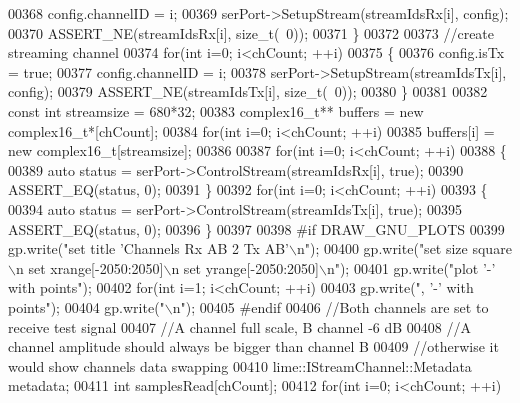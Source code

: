 \begin{DoxyCode}
{{{00368         config.channelID = i;
00369         serPort->SetupStream(streamIdsRx[i], config);
00370         ASSERT\_NE(streamIdsRx[i], \textcolor{keywordtype}{size\_t}(~0));
00371     \}
00372 
00373     \textcolor{comment}{//create streaming channel}
00374     \textcolor{keywordflow}{for}(\textcolor{keywordtype}{int} i=0; i<chCount; ++i)
00375     \{
00376         config.isTx = \textcolor{keyword}{true};
00377         config.channelID = i;
00378         serPort->SetupStream(streamIdsTx[i], config);
00379         ASSERT\_NE(streamIdsTx[i], \textcolor{keywordtype}{size\_t}(~0));
00380     \}
00381 
00382     \textcolor{keyword}{const} \textcolor{keywordtype}{int} streamsize = 680*32;
00383     complex16_t** buffers = \textcolor{keyword}{new} complex16_t*[chCount];
00384     \textcolor{keywordflow}{for}(\textcolor{keywordtype}{int} i=0; i<chCount; ++i)
00385         buffers[i] = \textcolor{keyword}{new} complex16_t[streamsize];
00386 
00387     \textcolor{keywordflow}{for}(\textcolor{keywordtype}{int} i=0; i<chCount; ++i)
00388     \{
00389         \textcolor{keyword}{auto} status = serPort->ControlStream(streamIdsRx[i], \textcolor{keyword}{true});
00390         ASSERT\_EQ(status, 0);
00391     \}
00392     \textcolor{keywordflow}{for}(\textcolor{keywordtype}{int} i=0; i<chCount; ++i)
00393     \{
00394         \textcolor{keyword}{auto} status = serPort->ControlStream(streamIdsTx[i], \textcolor{keyword}{true});
00395         ASSERT\_EQ(status, 0);
00396     \}
00397 
00398 \textcolor{preprocessor}{#if DRAW\_GNU\_PLOTS}
00399     gp.write(\textcolor{stringliteral}{"set title 'Channels Rx AB 2 Tx AB'\(\backslash\)n"});
00400     gp.write(\textcolor{stringliteral}{"set size square\(\backslash\)n set xrange[-2050:2050]\(\backslash\)n set yrange[-2050:2050]\(\backslash\)n"});
00401     gp.write(\textcolor{stringliteral}{"plot '-' with points"});
00402     \textcolor{keywordflow}{for}(\textcolor{keywordtype}{int} i=1; i<chCount; ++i)
00403         gp.write(\textcolor{stringliteral}{", '-' with points"});
00404     gp.write(\textcolor{stringliteral}{"\(\backslash\)n"});
00405 \textcolor{preprocessor}{#endif}
00406     \textcolor{comment}{//Both channels are set to receive test signal}
00407     \textcolor{comment}{//A channel full scale, B channel -6 dB}
00408     \textcolor{comment}{//A channel amplitude should always be bigger than channel B}
00409     \textcolor{comment}{//otherwise it would show channels data swapping}
00410     lime::IStreamChannel::Metadata metadata;
00411     \textcolor{keywordtype}{int} samplesRead[chCount];
00412     \textcolor{keywordflow}{for}(\textcolor{keywordtype}{int} i=0; i<chCount; ++i)
}}}
\end{DoxyCode}
